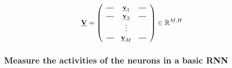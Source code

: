 \begin{frame}
\begin{itemize}
{\begin{equation}
\vec V = 
\left(
\begin{array}{ccc}
  \horzbar & \vec v_1 &  \horzbar \\
  \horzbar & \vec v_2 &  \horzbar \\
		   & \vdots    &          \\
  \horzbar & \vec v_M &  \horzbar
\end{array}
\right) \in \R^{M,H}
\end{equation}
}
\end{itemize}

\end{frame}

\subsubsection{Measure the activities of the neurons in a basic RNN}

